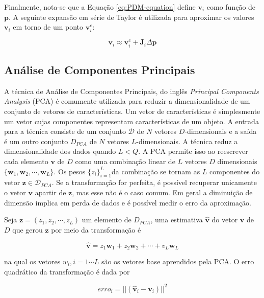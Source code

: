 {Finalmente, nota-se que a Equação \ref{eq:PDM-equation} define $\mathbf{v}_i$
como função de $\mathbf{p}$. A seguinte expansão em série de Taylor é utilizada
para aproximar os valores $\mathbf{v}_i$ em torno de um ponto $\mathbf{v}_i^c$:

\begin{equation}
\mathbf{v}_i \approx \mathbf{v}_i^c + \mathbf{J}_i \Delta \mathbf{p}
\label{eq:alg2}
\end{equation}


\subsection{Análise de Componentes Principais}

A técnica de Análise de Componentes Principais, do inglês
 \textit{Principal
Components Analysis} (PCA) é comumente utilizada para reduzir a dimensionalidade
de um conjunto de vetores de características. Um vetor de características é
simplesmente um vetor cujas componentes representam características de um
objeto.  A entrada para a técnica consiste de um conjunto $\mathcal{D}$ de $N$
vetores $D$-dimensionais e a saída é um outro conjunto $D_{PCA}$ de $N$ vetores
$L$-dimensionais. A técnica reduz a dimensionalidade dos dados quando $L < Q$. A
PCA permite isso ao reescrever cada elemento $\bm{v}$ de $D$ como uma combinação
linear de $L$ vetores $D$ dimensionais $\{ \mathbf{w}_1, \mathbf{w}_2, \cdots,
\mathbf{w}_L\}$.  Os pesos $\{z_i\}_{i=1}^L$da combinação se tornam as $L$
componentes do vetor $\mathbf{z} \in \mathcal{D}_{PCA}$. Se a transformação for
perfeita, é possível recuperar unicamente o vetor $\mathbf{v}$ apartir de
$\mathbf{z}$, mas esse não é o caso comum. Em geral a diminuição de dimensão
implica em perda de dados e é possível medir o erro da aproximação. 

Seja $\mathbf{z} = (z_1, z_2, \cdots, z_L)$ um elemento de $D_{PCA}$, uma
estimativa $\mathbf{\hat{v}}$ do vetor $\mathbf{v}$ de $D$ que gerou
$\mathbf{z}$ por meio da transformação é

\begin{equation}
\mathbf{\hat{v}} = z_1 \mathbf{w}_1 + z_2 \mathbf{w}_2 + \cdots + v_L \mathbf{w}_L
\end{equation}

na qual os vetores $w_i, i = 1 \cdots L$ são os vetores base aprendidos pela
PCA. O erro quadrático da transformação é dada por

\begin{equation}
erro_i = ||(\mathbf{\hat{v}}_{i} - \mathbf{v}_i)||^2
\end{equation}

}
